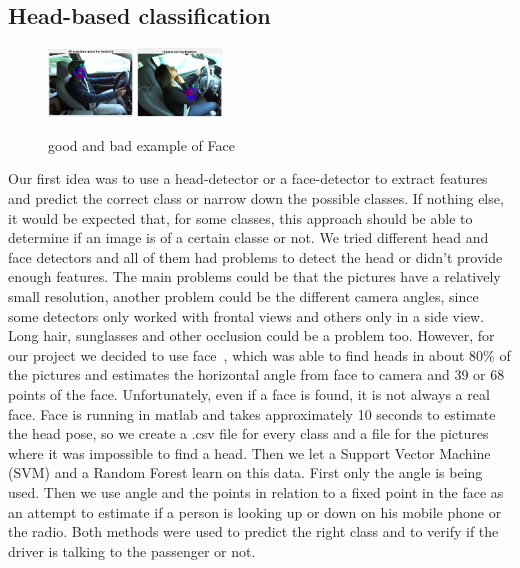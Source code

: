 \documentclass[10pt,twocolumn,letterpaper]{article}
\begin{document}
\subsection{Head-based classification}
\begin{figure}[h]
	\centering
	\includegraphics[width=0.2\textwidth]{face1}\hspace{0.01\textwidth}
	\includegraphics[width=0.2\textwidth]{faces/face7}\\ \vspace{0.01\textwidth}
	\caption{good and bad example of Face}
	\label{face_estimation_example}
\end{figure}
Our first idea was to use a head-detector or a face-detector to extract features and predict the correct class or narrow down the possible classes. If nothing else, it would be expected that, for some classes, this approach should be able to determine if an image is of a certain classe or not. We tried different head and face detectors and all of them had problems to detect the head or didn't provide enough features. The main problems could be that the pictures have a relatively small resolution, another problem could be the different camera angles, since some detectors only worked with frontal views and others only in a side view. Long hair, sunglasses and other occlusion could be a problem too. However, for our project we decided to use face~\cite{Ramanan:2012:FDP:2354409.2355119}, which was able to find heads in about 80\% of the pictures and estimates the horizontal angle from face to camera and 39 or 68 points of the face. Unfortunately, even if a face is found, it is not always a real face. Face is running in matlab and takes approximately 10 seconds to estimate the head pose, so we create a .csv file for every class and a file for the pictures where it was impossible to find a head. Then we let a Support Vector Machine (SVM) and a Random Forest learn on this data. First only the angle is being used. Then we use angle and the points in relation to a fixed point in the face as an attempt to estimate if a person is looking up or down on his mobile phone or the radio. Both methods were used to predict the right class and to verify if the driver is talking to the passenger or not.
\end{document}
